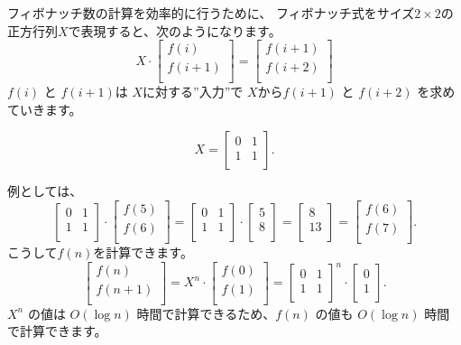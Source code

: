 \begin{samepage}
フィボナッチ数の計算を効率的に行うために、
フィボナッチ式をサイズ$2 \times 2$の 正方行列$X$で表現すると、次のようになります。
\[ X \cdot
 \begin{bmatrix}
  f(i) \\
  f(i+1) \\
 \end{bmatrix}
=
 \begin{bmatrix}
  f(i+1) \\
  f(i+2) \\
 \end{bmatrix}
 \]
$f(i)$ と $f(i+1)$は
 $X$に対する''入力''で
$X$から$f(i+1)$ と $f(i+2)$
を求めていきます。

\[ X =
 \begin{bmatrix}
  0 & 1 \\
  1 & 1 \\
 \end{bmatrix}.
\]
\end{samepage}
\noindent
例としては、
\[
 \begin{bmatrix}
  0 & 1 \\
  1 & 1 \\
 \end{bmatrix}
\cdot
 \begin{bmatrix}
  f(5) \\
  f(6) \\
 \end{bmatrix}
=
 \begin{bmatrix}
  0 & 1 \\
  1 & 1 \\
 \end{bmatrix}
\cdot
 \begin{bmatrix}
  5 \\
  8 \\
 \end{bmatrix}
=
 \begin{bmatrix}
  8 \\
  13 \\
 \end{bmatrix}
=
 \begin{bmatrix}
  f(6) \\
  f(7) \\
 \end{bmatrix}.
\]
こうして$f(n)$を計算できます。
\[
 \begin{bmatrix}
  f(n) \\
  f(n+1) \\
 \end{bmatrix}
=
X^n \cdot
 \begin{bmatrix}
  f(0) \\
  f(1) \\
 \end{bmatrix}
=
 \begin{bmatrix}
  0 & 1 \\
  1 & 1 \\
 \end{bmatrix}^n
\cdot
 \begin{bmatrix}
  0 \\
  1 \\
 \end{bmatrix}.
\]
$X^n$ の値は $O(\log n)$  時間で計算できるため、$f(n)$ の値も $O(\log n)$  時間で計算できます。

